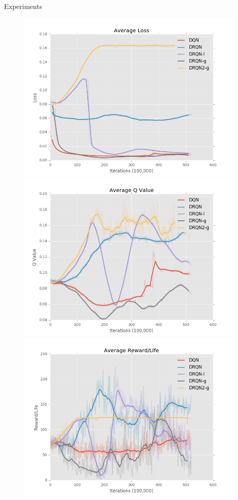 \documentclass[final]{beamer}
\newlength{\twocolwid}
\begin{document}
\begin{frame}[t]
\begin{columns}[t]
\begin{column}{\twocolwid}
\begin{column}{\twocolwid}
\begin{block}{Experiments}
\begin{figure}[h]
    \centering
    \begin{minipage}{1.0\textwidth}
        \centering
        \includegraphics[scale=0.9]{avg_loss}
        \centering
        \includegraphics[scale=0.9]{avg_q}
        \centering
        \includegraphics[scale=0.9]{avg_reward}

\end{minipage}
\end{figure}
\end{block}
\end{column}
\end{column}
\end{columns}
\end{frame}
\end{document}

